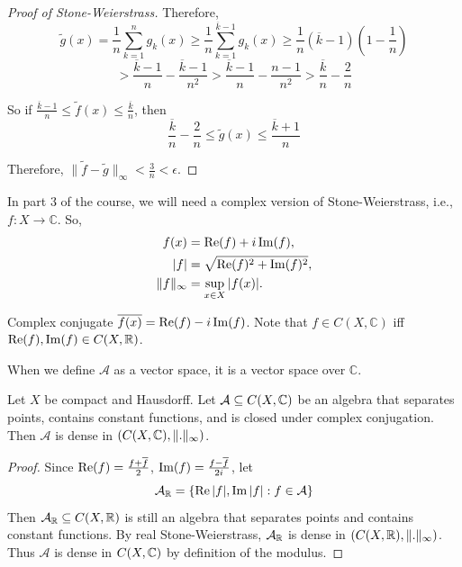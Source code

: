\begin{proof}[Proof of Stone-Weierstrass]
    Therefore,
    \[
        \tilde{g}(x) = \frac{1}{n} \sum_{k=1}^n g_k(x) \geq \frac{1}{n}\sum_{k = 1}^{\overline{k} - 1} g_k(x) \geq \frac{1}{n}(\overline{k} - 1)\left(1 - \frac{1}{n}\right)
    \]
    \[
        > \frac{\overline{k} - 1}{n} - \frac{\overline{k} - 1}{n^2} > 
        \frac{\overline{k} - 1}{n} - \frac{n - 1}{n^2} > \frac{\overline{k}}{n} - \frac{2}{n}
    \]

    So if $\frac{\overline{k} - 1}{n} \leq \tilde{f}(x) \leq \frac{\overline{k}}{n}$, then
    \[
        \frac{\overline{k}}{n} - \frac{2}{n} \leq \tilde{g}(x) \leq \frac{\overline{k} + 1}{n}
    \] 

    Therefore, $\| \tilde{f} - \tilde{g} \|_{\infty} < \frac{3}{n} < \epsilon$. \qedhere
\end{proof}

\noindent In part 3 of the course, we will need a complex version of Stone-Weierstrass, i.e., 
$f : X \to \mathbb{C}$. So,
\begin{align*}
    f(x) &= \operatorname{Re}(f) + i\operatorname{Im}(f), \\
    |f| &= \sqrt{\operatorname{Re}(f)^2 + \operatorname{Im}(f)^2}, \\
    \| f \|_{\infty} &= \sup_{x \in X} |f(x)|.
\end{align*}

\noindent Complex conjugate $\overline{f(x)} = \operatorname{Re}(f) - i\operatorname{Im}(f)$. 
Note that $f \in C(X, \mathbb{C})$ iff $\operatorname{Re}(f), \operatorname{Im}(f) \in C(X, \mathbb{R})$.

\noindent When we define $\mathcal{A}$ as a vector space, it is a vector space over $\mathbb{C}$.

\begin{thm} 
    Let $X$ be compact and Hausdorff. Let $\mathcal{A} \subseteq C(X, \mathbb{C})$ be an algebra that
    separates points, contains constant functions, and is closed under complex conjugation. 
    Then $\mathcal{A}$ is dense in $(C(X, \mathbb{C}), \| . \|_{\infty} )$.  
    
\end{thm}

\begin{proof}
    Since $\operatorname{Re}(f) = \frac{f + \overline{f}}{2}$, $\operatorname{Im}(f) = \frac{f - \overline{f}}{2i}$, let
    \[
        \mathcal{A}_{\mathbb{R}} = \left\{ \operatorname{Re}|f|, \operatorname{Im}|f| : f \in \mathcal{A} \right\} 
    \] 
    Then $\mathcal{A}_{\mathbb{R}} \subseteq C(X, \mathbb{R})$ is still an algebra that separates points and contains 
    constant functions. By real Stone-Weierstrass, $\mathcal{A}_{\mathbb{R}}$ is dense in 
    $(C(X, \mathbb{R}), \| . \|_{\infty} )$. Thus $\mathcal{A}$ is dense in $C(X, \mathbb{C})$ 
    by definition of the modulus. \qedhere  
\end{proof}